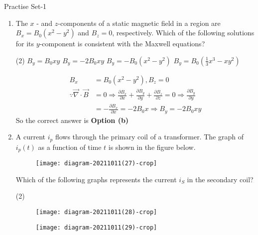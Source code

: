 
\begin{abox}
	Practise Set-1
\end{abox}
\begin{enumerate}
	\item The $x$ - and $z$-components of a static magnetic field in a region are $B_{x}=B_{0}\left(x^{2}-y^{2}\right)$ and $B_{z}=0$, respectively. Which of the following solutions for its $y$-component is consistent with the Maxwell equations?
	{}
	\begin{tasks}(2)
		\task[\textbf{a.}]$B_{y}=B_{0} x y$
		\task[\textbf{b.}]$B_{y}=-2 B_{0} x y$
		\task[\textbf{c.}] $B_{y}=-B_{0}\left(x^{2}-y^{2}\right)$
		\task[\textbf{d.}]  $B_{y}=B_{0}\left(\frac{1}{3} x^{3}-x y^{2}\right)$
	\end{tasks}
\begin{answer}
	\begin{align*}
	B_{x}&=B_{0}\left(x^{2}-y^{2}\right), B_{z}=0\\
	\because \vec{\nabla} \cdot \vec{B}&=0 \Rightarrow \frac{\partial B_{x}}{\partial x}+\frac{\partial B_{y}}{\partial y}+\frac{\partial B_{z}}{\partial z}=0 \Rightarrow \frac{\partial B_{y}}{\partial y}\\&=-\frac{\partial B_{x}}{\partial x}=-2 B_{0} x \Rightarrow B_{y}=-2 B_{0} x y
	\end{align*}
	So the correct answer is \textbf{Option (b)}
\end{answer}
	\item A current $i_{p}$ flows through the primary coil of a transformer. The graph of $i_{p}(t)$ as a function of time $t$ is shown in the figure below.\\
	\begin{figure}[H]
		\centering
		\texttt{[image: diagram-20211011(27)-crop]}
	\end{figure}
	Which of the following graphs represents the current $i_{S}$ in the secondary coil?
	{}
	\begin{tasks}(2)
		\task[\textbf{a.}] \begin{figure}[H]
			\centering
			\texttt{[image: diagram-20211011(28)-crop]}
		\end{figure}
		\task[\textbf{b.}] \begin{figure}[H]
			\centering
			\texttt{[image: diagram-20211011(29)-crop]}
		\end{figure}
		\task[\textbf{c.}] \begin{figure}[H]

\end{figure}
\end{tasks}
\end{enumerate}
